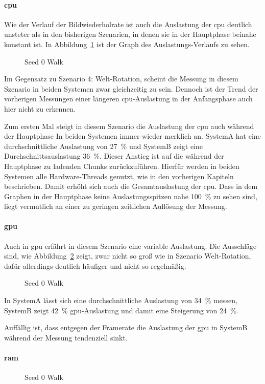 \paragraph{\ac{cpu}}
Wie der Verlauf der Bildwiederholrate ist auch die Auslastung der \ac{cpu} deutlich unsteter als in den bisherigen Szenarien, in denen sie in der Hauptphase beinahe konstant ist. In Abbildung~\ref{fig:seed-0-walk-cpu} ist der Graph des Auslastungs-Verlaufs zu sehen.
\begin{figure}[!htbp]
	\caption{Seed 0 Walk}\label{fig:seed-0-walk-cpu}
\end{figure}
Im Gegensatz zu Szenario 4: Welt-Rotation, scheint die Messung in diesem Szenario in beiden Systemen zwar gleichzeitig zu sein. Dennoch ist der Trend der vorherigen Messungen einer längeren \ac{cpu}-Auslastung in der Anfangsphase auch hier nicht zu erkennen. 

Zum ersten Mal steigt in diesem Szenario die Auslastung der \ac{cpu} auch während der Hauptphase In beiden Systemen immer wieder merklich an. SystemA hat eine durchschnittliche Auslastung von \SI{27}{\percent} und SystemB zeigt eine Durchschnittsauslastung \SI{36}{\percent}. Dieser Anstieg ist auf die während der Hauptphase zu ladenden Chunks zurückzuführen. Hierfür werden in beiden Systemen alle Hardware-Threads genutzt, wie in den vorherigen Kapiteln beschrieben. Damit erhöht sich auch die Gesamtauslastung der \ac{cpu}. Dass in dem Graphen in der Hauptphase keine Auslastungsspitzen nahe \SI{100}{\percent} zu sehen sind, liegt vermutlich an einer zu geringen zeitlichen Auflösung der Messung.

\paragraph{\ac{gpu}}
Auch in \ac{gpu} erfährt in diesem Szenario eine variable Auslastung. Die Ausschläge sind, wie Abbildung~\ref{fig:seed-0-walk-gpu} zeigt, zwar nicht so groß wie in Szenario Welt-Rotation, dafür allerdings deutlich häufiger und nicht so regelmäßig.
\begin{figure}[!htbp]
	\caption{Seed 0 Walk}\label{fig:seed-0-walk-gpu}
\end{figure}
In SystemA lässt sich eine durchschnittliche Auslastung von \SI{34}{\percent} messen, SystemB zeigt \SI{42}{\percent} \ac{gpu}-Auslastung und damit eine Steigerung von \SI{24}{\percent}.

Auffällig ist, dass entgegen der Framerate die Auslastung der \ac{gpu} in SystemB während der Messung tendenziell sinkt.

\paragraph{\ac{ram}}
\begin{figure}[!htbp]
	\caption{Seed 0 Walk}\label{fig:seed-0-walk-mem}
\end{figure} 


